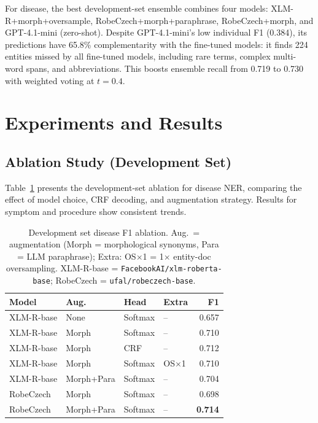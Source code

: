 \documentclass[11pt]{article}
\begin{document}
For disease, the best development-set ensemble combines four models: XLM-R+morph+oversample,
RobeCzech+morph+paraphrase, RobeCzech+morph, and GPT-4.1-mini (zero-shot). Despite
GPT-4.1-mini's low individual F1 (0.384), its predictions have 65.8\% complementarity
with the fine-tuned models: it finds 224 entities missed by all fine-tuned models,
including rare terms, complex multi-word spans, and abbreviations. This boosts ensemble
recall from 0.719 to 0.730 with weighted voting at $t=0.4$.

\section{Experiments and Results}

\subsection{Ablation Study (Development Set)}

Table~\ref{tab:ablation} presents the development-set ablation for disease NER, comparing
the effect of model choice, CRF decoding, and augmentation strategy. Results for
symptom and procedure show consistent trends.

\begin{table}[h]
\centering
\small
\begin{tabular}{llllr}
\toprule
\textbf{Model} & \textbf{Aug.} & \textbf{Head} & \textbf{Extra} & \textbf{F1} \\
\midrule
XLM-R-base & None    & Softmax & {--}         & 0.657 \\
XLM-R-base & Morph   & Softmax & {--}         & 0.710 \\
XLM-R-base & Morph   & CRF     & {--}         & 0.712 \\
XLM-R-base & Morph   & Softmax & OS$\times$1 & 0.710 \\
XLM-R-base & Morph+Para & Softmax & {--}      & 0.704 \\
RobeCzech  & Morph   & Softmax & {--}         & 0.698 \\
RobeCzech  & Morph+Para & Softmax & {--}      & \textbf{0.714} \\
\bottomrule
\end{tabular}
\caption{Development set disease F1 ablation. Aug.\ = augmentation (Morph = morphological
synonyms, Para = LLM paraphrase); Extra: OS$\times$1 = 1$\times$ entity-doc oversampling.
XLM-R-base = \texttt{FacebookAI/xlm-roberta-base}; RobeCzech = \texttt{ufal/robeczech-base}.}
\label{tab:ablation}
\end{table}
\end{document}
